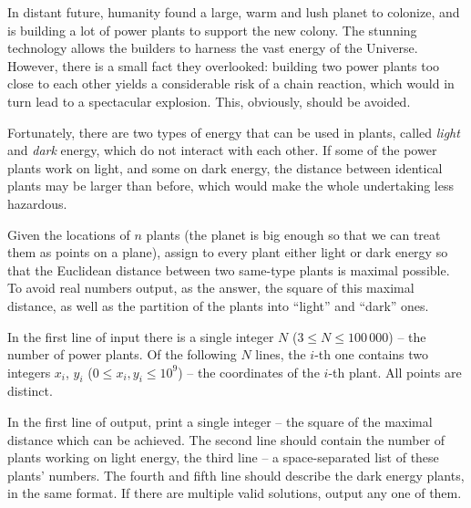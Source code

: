 





In distant future, humanity found a large, warm and lush planet to colonize, and is building a lot of power plants to support the new colony. The stunning technology allows the builders to harness the vast energy of the Universe. However, there is a small fact they overlooked: building two power plants too close to each other yields a considerable risk of a chain reaction, which would in turn lead to a spectacular explosion. This, obviously, should be avoided.

Fortunately, there are two types of energy that can be used in plants, called \textit{light} and \textit{dark} energy, which do not interact with each other. If some of the power plants work on light, and some on dark energy, the distance between identical plants may be larger than before, which would make the whole undertaking less hazardous.




Given the locations of $n$ plants (the planet is big enough so that we can treat them as points on a plane), assign to every plant either light or dark energy so that the Euclidean distance between two same-type plants is maximal possible. To avoid real numbers output, as the answer, the square of this maximal distance, as well as the partition of the plants into ``light'' and ``dark'' ones.


In the first line of input there is a single integer $N$ ($3 \leq N \leq 100\,000$) -- the number of power plants.
Of the following $N$ lines, the $i$-th one contains two integers $x_i$, $y_i$ ($0 \leq x_i, y_i \leq 10^9$) -- the coordinates of the $i$-th plant. All points are distinct.


In the first line of output, print a single integer -- the square of the maximal distance which can be achieved. The second line should contain the number of plants working on light energy, the third line -- a space-separated list of these plants' numbers. The fourth and fifth line should describe the dark energy plants, in the same format. If there are multiple valid solutions, output any one of them.


